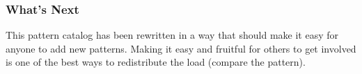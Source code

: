 \subsubsection*{What's Next} This pattern catalog has been rewritten in a way
that should make it easy for anyone to add new patterns. Making it easy
and fruitful for others to get involved is one of the best ways to
redistribute the load (compare
the 
pattern).

